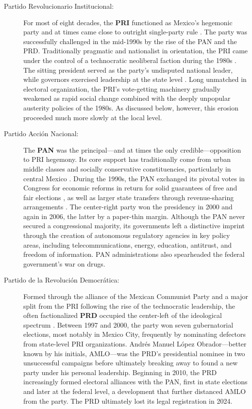 \documentclass[letter,12pt]{article}
\begin{document}
\begin{description}

\item[Partido Revolucionario Institucional:] For most of eight decades, the \textbf{PRI} functioned as Mexico's hegemonic party and at times came close to outright single-party rule \citep{molinar.1991a}. The party was successfully challenged in the mid-1990s by the rise of the PAN and the PRD. Traditionally pragmatic and nationalist in orientation, the PRI came under the control of a technocratic neoliberal faction during the 1980s \citep{dresser.Neolib1991}. The sitting president served as the party's undisputed national leader, while governors exercised leadership at the state level \citep{langston.2010}. Long unmatched in electoral organization, the PRI's vote-getting machinery gradually weakened as rapid social change combined with the deeply unpopular austerity policies of the 1980s. As discussed below, however, this erosion proceeded much more slowly at the local level.

\item[Partido Acción Nacional:] The \textbf{PAN} was the principal---and at times the only credible---opposition to PRI hegemony. Its core support has traditionally come from urban middle classes and socially conservative constituencies, particularly in central Mexico \citep{loaeza.pan.2010book}. During the 1990s, the PAN exchanged its pivotal votes in Congress for economic reforms in return for solid guarantees of free and fair elections \citep{cornelius.1996}, as well as larger state transfers through revenue-sharing arrangements \citep{diaz.cayeros.2006, shirk.PANbook.2005}. The center-right party won the presidency in 2000 and again in 2006, the latter by a paper-thin margin. Although the PAN never secured a congressional majority, its governments left a distinctive imprint through the creation of autonomous regulatory agencies in key policy areas, including telecommunications, energy, education, antitrust, and freedom of information. PAN administrations also spearheaded the federal government's war on drugs.

\item[Partido de la Revolución Democrática:] Formed through the alliance of the Mexican Communist Party and a major split from the PRI following the rise of the technocratic leadership, the often factionalized \textbf{PRD} occupied the center-left of the ideological spectrum \citep{bruhn.1997, cantuCSG2019apsr}. Between 1997 and 2000, the party won seven gubernatorial elections, most notably in Mexico City, frequently by nominating defectors from state-level PRI organizations. Andrés Manuel López Obrador---better known by his initials, AMLO---was the PRD's presidential nominee in two unsuccessful campaigns before ultimately breaking away to found a new party under his personal leadership. Beginning in 2010, the PRD increasingly formed electoral alliances with the PAN, first in state elections and later at the federal level, a development that further distanced AMLO from the party. The PRD ultimately lost its legal registration in 2024.


\end{description}
\end{document}
